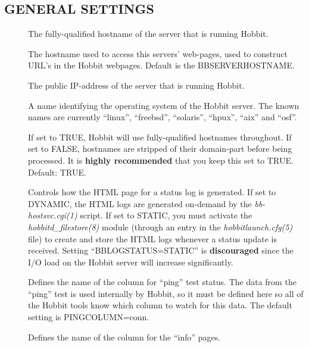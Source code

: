 \subsection{GENERAL SETTINGS}


\begin{description}

\item[] The fully-qualified hostname of the server that is running Hobbit. 

\item[] The hostname used to access this servers'
  web-pages, used to construct URL's in the Hobbit webpages. Default
  is the BBSERVERHOSTNAME. 


\item[] The public IP-address of the server that is running Hobbit. 
 

\item[] A name identifying the operating system of the
  Hobbit server. The known names are currently ``linux'', ``freebsd'',
  ``solaris'', ``hpux'', ``aix'' and ``osf''. 

\item[] If set to TRUE, Hobbit will use fully-qualified hostnames
  throughout. If set to FALSE, hostnames are stripped of their
  domain-part before being processed. It is \textbf{highly
  recommended} that you keep this set to TRUE. Default: TRUE. 

\item[] Controls how the HTML page for a status log is
  generated. If set to DYNAMIC, the HTML logs are generated on-demand
  by the \emph{bb-hostsvc.cgi(1)} script. If set to STATIC, you must
  activate the \emph{hobbitd\_filestore(8)} module (through an entry
  in the \emph{hobbitlaunch.cfg(5)} file) to create and store the HTML
  logs whenever a status update is received. Setting
  ``BBLOGSTATUS=STATIC'' is \textbf{discouraged} since the I/O load on
  the Hobbit server will increase significantly. 


\item[] Defines the name of the column for ``ping'' test
  status. The data from the ``ping'' test is used internally by
  Hobbit, so it must be defined here so all of the Hobbit tools know
  which column to watch for this data. The default setting is
  PINGCOLUMN=conn. 

\item[] Defines the name of the column for the ``info'' pages. 


\end{description}
